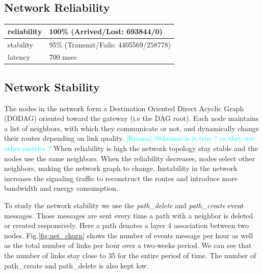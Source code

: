 \documentclass{sig-alternate}
\newcommand{\keoma}[1]              {\textcolor{cyan}{[Keoma] #1}}
\begin{document}
\subsection{Network Reliability}
\label{sec:net_reliability}

\begin{table}
    \begin{tabular}{|l|l|}
        \hline
        reliability & 100\% (Arrived/Lost:   693844/0)\\ \hline
        stability   & 95\% (Transmit/Fails: 4405569/258778)\\ \hline
        latency     & 700 msec\\
        \hline
    \end{tabular}
\end{table}

\subsection{Network Stability}
\label{sec:net_stability}


The nodes in the network form a Destination Oriented Direct Acyclic Graph (DODAG) oriented toward the gateway (i.e the DAG root).
Each node maintains a list of neighbors, with which they communicate or not, and dynamically change their routes depending on link quality. \keoma{@thomas:is it true ? or they use other metrics ?}
When reliability is high the network topology stay stable and the nodes use the same neighbors.
When the reliability decreases, nodes select other neighbors, making the network graph to change.
Instability in the network increases the signaling traffic to reconstruct the routes and introduce more bandwidth and energy consumption.


To study the network stability we use the \textit{path\_delete} and \textit{path\_create} event messages.
Those messages are sent every time a path with a neighbor is deleted or created responsively.
Here a path denotes a layer 4 association between two nodes.
Fig.\ref{fig:net_churn} shows the number of events message per hour as well as the total number of links per hour over a two-weeks period.
We can see that the number of links stay close to 35 for the entire period of time.
The number of path\_create and path\_delete is also kept low.
\end{document}
